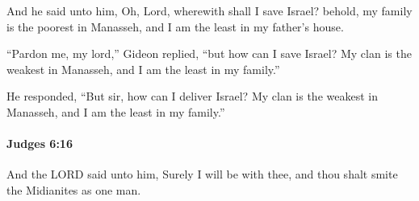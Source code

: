 			\begin{versebox}
					\item[BHS] 
					\item[ASV] And he said unto him, Oh, Lord, wherewith shall I save Israel? behold, my family is the poorest in Manasseh, and I am the least in my father's house.
					\item[NIV] “Pardon me, my lord,” Gideon replied, “but how can I save Israel? My clan is the weakest in Manasseh, and I am the least in my family.”
					\item[NRSV] He responded, “But sir, how can I deliver Israel? My clan is the weakest in Manasseh, and I am the least in my family.”
			\end{versebox}

		\paragraph{Judges 6:16} %
			\label{JUDGES-6-16}

			And the LORD said unto him, Surely I will be with thee, and thou shalt smite the Midianites as one man.

